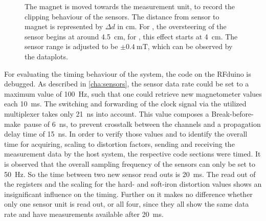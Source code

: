 \begin{figure}[!htb]
\hfill
{}
\caption[Clipping behaviour of sensor]
{The magnet is moved towards the measurement unit, to record the clipping behaviour of the sensors. The distance from sensor to magnet is represented by $ \Delta d $ in \si{\cm}. For \label{fig:negClip}, the oversteering of the sensor begins at around \SI{4.5}{\cm}, for \label{fig:posClip}, this effect starts at \SI{4}{\cm}. The sensor range is adjusted to be $ \pm \SI{0.4}{\milli \tesla} $, which can be observed by the dataplots.}
\label{fig:clipping}
\end{figure}
For evaluating the timing behaviour of the system, the code on the RFduino is debugged. As described in \ref{cha:sensors}, the sensor data rate could be set to a maximum value of \SI{100}{\Hz}, such that one could retrieve new magnetometer values each \SI{10}{\milli \second}. The switching and forwarding of the clock signal via the utilized multiplexer takes only \SI{21}{\nano \second} into account. This value composes a \grqq Break-before-make\grqq \, pause of \SI{6}{\nano \second}, to prevent crosstalk between the channels and a propagation delay time of \SI{15}{\nano \second}. In order to verify those values and to identify the overall time for acquiring, scaling to distortion factors, sending and receiving the measurement data by the host system, the respective code sections were timed. It is observed that the overall sampling frequency of the sensors can only be set to \SI{50}{\Hz}. So the time between two new sensor read outs is \SI{20}{\milli \second}. The read out of the registers and the scaling for the hard- and soft-iron distortion values shows an insignificant influence on the timing. Further on it makes no difference whether only one sensor unit is read out, or all four, since they all show the same data rate and have measurements available after \SI{20}{\milli \second}.\\
